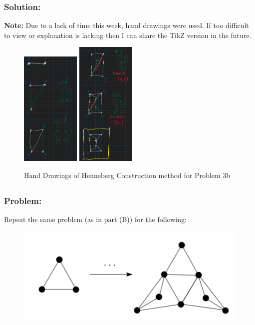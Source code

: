 \documentclass[]{article}
\numberwithin{equation}{section}
\begin{document}
\subsubsection*{Solution:}

\textbf{Note:} Due to a lack of time this week, hand drawings were used. 
If too difficult to view or explanation is lacking then I can share the TikZ version in the future.

\begin{figure}[h]
    \centering
    \includegraphics[width=0.25\textwidth]{figs/pblm3b_1.png}
    \includegraphics[width=0.25\textwidth]{figs/pblm3b_2.png}
    \caption{Hand Drawings of Henneberg Construction method for Problem 3b}
\end{figure}

\newpage
\subsection{}
\subsubsection*{Problem:}
Repeat the same problem (as in part (B)) for the following:
\begin{figure}[h]
    \centering
    \includegraphics[width = 0.5 \textwidth]{figs/pblm3c_pblm.png}
\end{figure}
\end{document}
